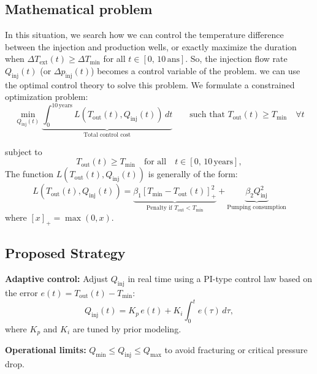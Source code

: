 \documentclass[a4paper,12pt]{report}
\begin{document}
\subsection{Mathematical problem}
In this situation, we search how we can control the temperature difference between the injection and production wells, 
or exactly maximize the duration when $\Delta T_{\text{ext}}(t) \geq \Delta T_{\min}$ for all $t \in [0,\,10\,\text{ans}]$.
So, the injection flow rate $Q_{\text{inj}}(t)$ (or $\Delta p_{\text{inj}}(t)$) becomes a control variable of the problem. we can use the optimal control theory to solve this problem. We formulate a constrained optimization problem:
\begin{equation}
\min_{Q_{\text{inj}}(t)} \underbrace{\int_0^{10\, \text{years}} L(T_{\text{out}}(t), Q_{\text{inj}}(t))\,dt}_{\text{Total control cost}}
\qquad
\text{such that } T_{\text{out}}(t) \geq T_{\min} \quad \forall t
\end{equation}

subject to
\begin{equation}
    T_{\text{out}}(t) \geq T_{\min} \quad \text{for all} \quad t \in [0,\,10\,\text{years}],
\end{equation}
The function $L(T_{\text{out}}(t), Q_{\text{inj}}(t))$ is generally of the form:
\begin{equation}
L(T_{\text{out}}(t), Q_{\text{inj}}(t)) =
\underbrace{\beta_1 [T_{\min} - T_{\text{out}}(t)]_+^2}_{\text{Penalty if } T_{\text{out}} < T_{\min}}
+ \underbrace{\beta_2 Q_{\text{inj}}^2}_{\text{Pumping consumption}}
\end{equation}
where $[x]_+ = \max(0, x)$.
\subsection{Proposed Strategy}

\textbf{Adaptive control:} Adjust $Q_{\text{inj}}$ in real time using a PI-type control law based on the error $e(t) = T_{\text{out}}(t) - T_{\min}$:
\begin{equation}
Q_{\text{inj}}(t) = K_p\, e(t) + K_i \int_{0}^{t} e(\tau)\, d\tau,
\end{equation}
where $K_p$ and $K_i$ are tuned by prior modeling.

\textbf{Operational limits:} $Q_{\min} \leq Q_{\text{inj}} \leq Q_{\max}$ to avoid fracturing or critical pressure drop.
\end{document}
